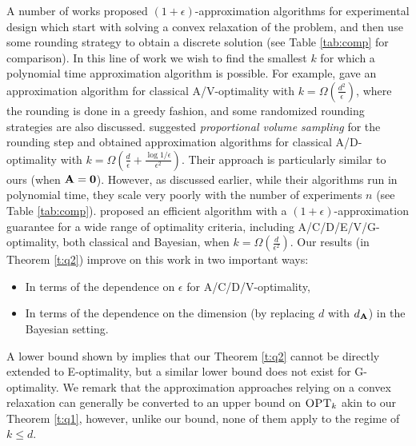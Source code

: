 \documentclass[thesis.tex]{subfiles}
\begin{document}
A number of works proposed $(1+\epsilon)$-approximation algorithms
for experimental design which start with solving a convex
relaxation of the problem, and then use some rounding strategy to
obtain a discrete solution (see Table \ref{tab:comp} for comparison).
In this line of work we wish to find the smallest $k$ for which a
polynomial time approximation algorithm is possible. For example,
\cite{tractable-experimental-design} gave an approximation algorithm
for classical A/V-optimality with $k=\Omega(\frac{d^2}{\epsilon})$, where the
rounding is done in a greedy fashion, and some randomized rounding
strategies are also discussed. \cite{proportional-volume-sampling}
suggested \emph{proportional volume sampling} for the rounding step
and obtained approximation algorithms for classical A/D-optimality with
$k=\Omega(\frac d\epsilon+\frac {\log1/\epsilon}{\epsilon^2})$. Their
approach is particularly similar to ours (when $\mathbf A=\mathbf 0$). However,
as discussed earlier, while their algorithms run in polynomial time,
they scale very poorly with the number of experiments $n$ (see Table 
\ref{tab:comp}). \cite{near-optimal-design} proposed  
an efficient algorithm with a $(1+\epsilon)$-approximation guarantee for a wide
range of optimality criteria, including A/C/D/E/V/G-optimality, both classical and Bayesian, when
$k=\Omega(\frac d{\epsilon^2})$.  Our results (in Theorem \ref{t:q2}) improve on this work in
two important ways: 
\begin{itemize}
  \item In terms of the dependence on $\epsilon$ for A/C/D/V-optimality,
  \item In terms of the dependence on the dimension 
  (by replacing $d$ with $d_{\mathbf A}$) in the Bayesian setting.
\end{itemize}
A lower bound shown by \cite{proportional-volume-sampling} implies that our
Theorem \ref{t:q2} cannot be
directly extended to E-optimality, but a similar lower bound does not
exist for G-optimality. We remark that the approximation approaches
relying on a convex relaxation can generally be converted to
an upper bound on ${\textsc{OPT}_k}$ akin to our Theorem \ref{t:q1},
however, unlike our bound, none of them apply to the regime of $k\leq d$.
\end{document}

